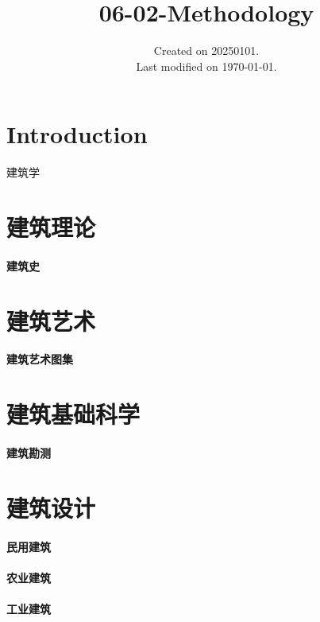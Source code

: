 \documentclass[UTF8]{../../ApplicationUniverse}
\begin{document}
\title{06-02-Methodology}
\date{Created on 20250101.\\   Last modified on \today.}
\maketitle
\tableofcontents


\chapter{Introduction}

建筑学


\chapter{建筑理论}
\subsubsection{建筑史}


\chapter{建筑艺术}
\subsubsection{建筑艺术图集}


\chapter{建筑基础科学}
\subsubsection{建筑勘测}


\chapter{建筑设计}
\subsubsection{民用建筑}
\subsubsection{农业建筑}
\subsubsection{工业建筑}
\end{document}
